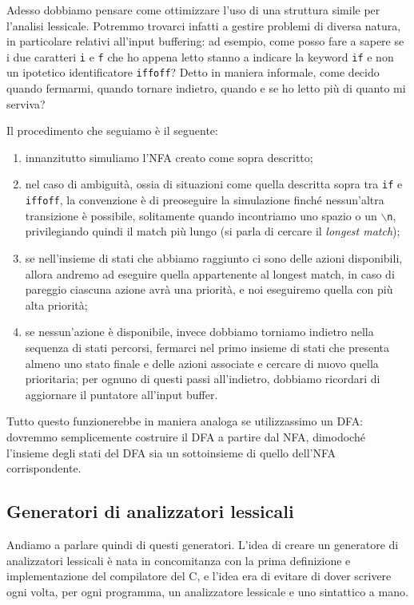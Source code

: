\documentclass[class=book, crop=false, oneside, 12pt]{standalone}
\begin{document}
Adesso dobbiamo pensare come ottimizzare l'uso di una struttura simile per l'analisi lessicale. Potremmo trovarci infatti a gestire problemi di diversa natura, in particolare relativi all'input buffering: ad esempio, come posso fare a sapere se i due caratteri \texttt{i} e \texttt{f} che ho appena letto stanno a indicare la keyword \texttt{if} e non un ipotetico identificatore \texttt{iffoff}? Detto in maniera informale, come decido quando fermarmi, quando tornare indietro, quando e se ho letto più di quanto mi serviva?

Il procedimento che seguiamo è il seguente:
\begin{enumerate}
    \item innanzitutto simuliamo l'NFA creato come sopra descritto;
    \item nel caso di ambiguità, ossia di situazioni come quella descritta sopra tra \texttt{if} e \texttt{iffoff}, la convenzione è di preoseguire la simulazione finché nessun’altra transizione è possibile, solitamente quando incontriamo uno spazio o un \texttt{\(\backslash\)n}, privilegiando quindi il match più lungo (si parla di cercare il \emph{longest match});
    \item se nell'insieme di stati che abbiamo raggiunto ci sono delle azioni disponibili, allora andremo ad eseguire quella appartenente al longest match, in caso di pareggio ciascuna azione avrà una priorità, e noi eseguiremo quella con più alta priorità;
    \item se nessun'azione è disponibile, invece dobbiamo torniamo indietro nella sequenza di stati percorsi, fermarci nel primo insieme di stati che presenta almeno uno stato finale e delle azioni associate e cercare di nuovo quella prioritaria; per ognuno di questi passi all'indietro, dobbiamo ricordari di aggiornare il puntatore all'input buffer.
\end{enumerate}

Tutto questo funzionerebbe in maniera analoga se utilizzassimo un DFA: dovremmo semplicemente costruire il DFA a partire dal NFA, dimodoché l'insieme degli stati del DFA sia un sottoinsieme di quello dell'NFA corrispondente.

\subsection{Generatori di analizzatori lessicali}
Andiamo a parlare quindi di questi generatori. L'idea di creare un generatore di analizzatori lessicali è nata in concomitanza con la prima definizione e implementazione del compilatore del C, e l'idea era di evitare di dover scrivere ogni volta, per ogni programma, un analizzatore lessicale e uno sintattico a mano.
\end{document}
